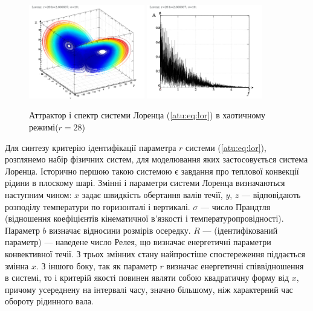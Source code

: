 \documentclass[a4paper,13pt]{atuaref}
\begin{document}
\begin{figure}[ht!]
\begin{center}
  \includegraphics[width=0.45\textwidth]{p5/p/cha/lor/lor0-p_xyz_r=028.png}
  \hfill
  \includegraphics[width=0.45\textwidth]{p5/p/cha/lor/lor0_fft-p_f_r=028.png}
\end{center}
  \caption{Аттрактор і спектр системи Лоренца (\ref{atu:eq:lor}) в хаотичному режимі($r=28$)}
\label{atu:f:lor_attractor_phase_chaos28}
\end{figure}

Для синтезу критерію ідентифікації параметра $ r $ системи
(\ref{atu:eq:lor}), розглянемо набір фізичних систем, для моделювання яких застосовується
система Лоренца. Історично першою такою системою є завдання про теплової
конвекції рідини в плоскому шарі.
Змінні і параметри системи Лоренца визначаються наступним чином: $ x $ задає
швидкість обертання валів течії, $ y $, $ z $ --- відповідають розподілу
температури по горизонталі і вертикалі. $ \sigma $ --- число Прандтля
(відношення коефіцієнтів кінематичної в'язкості і температуропровідності).
Параметр $ b $ визначає відносини розмірів осередку. $ R $ --- (ідентифікований
параметр) --- наведене число Релея, що визначає енергетичні параметри
конвективної течії.
З трьох змінних стану найпростіше спостереження піддається змінна $ x $.
З іншого боку, так як параметр $ r $ визначає енергетичні співвідношення в
системі, то і критерій якості повинен являти собою квадратичну форму від $ x $,
причому усереднену на інтервалі часу, значно більшому, ніж характерний час
обороту рідинного вала.
\end{document}
